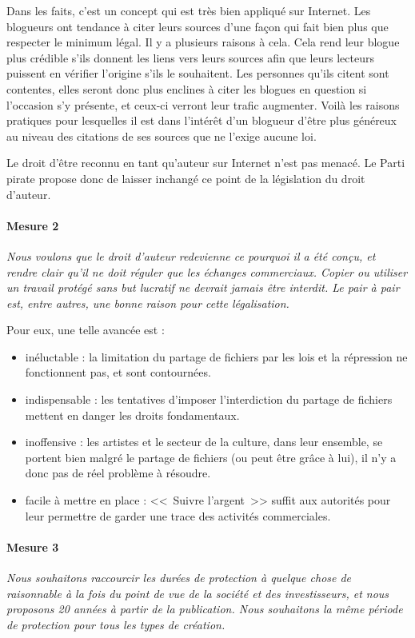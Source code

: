 Dans les faits, c'est un concept qui est très bien appliqué sur Internet.
Les blogueurs ont tendance à citer leurs sources d'une façon qui fait bien plus que respecter le minimum légal.
Il y a plusieurs raisons à cela.
Cela rend leur blogue plus crédible s'ils donnent les liens vers leurs sources afin que leurs lecteurs puissent en vérifier l'origine s'ils le souhaitent.
Les personnes qu'ils citent sont contentes, elles seront donc plus enclines à citer les blogues en question si l'occasion s'y présente, et ceux-ci verront leur trafic augmenter.
Voilà les raisons pratiques pour lesquelles il est dans l'intérêt d'un blogueur d'être plus généreux au niveau des citations de ses sources que ne l'exige aucune loi.

Le droit d'être reconnu en tant qu'auteur sur Internet n'est pas menacé.
Le Parti pirate propose donc de laisser inchangé ce point de la législation du droit d'auteur.

\paragraph{Mesure 2}
\textit{Nous voulons que le droit d'auteur redevienne ce pourquoi il a été conçu, et rendre clair qu'il ne doit réguler que les échanges commerciaux. Copier ou utiliser un travail protégé sans but lucratif ne devrait jamais être interdit.
Le pair à pair est, entre autres, une bonne raison pour cette légalisation.}

Pour eux, une telle avancée est :

\begin{itemize}
\item inéluctable : la limitation du partage de fichiers par les lois et la répression ne fonctionnent pas, et sont contournées.
\item indispensable : les tentatives d'imposer l'interdiction du partage de fichiers mettent en danger les droits fondamentaux.
\item inoffensive : les artistes et le secteur de la culture, dans leur ensemble, se portent bien malgré le partage de fichiers (ou peut être grâce à lui), il n'y a donc pas de réel problème à résoudre.
\item facile à mettre en place : <<~Suivre l'argent~>> suffit aux autorités pour leur permettre de garder une trace des activités commerciales.
\end{itemize}

\paragraph{Mesure 3}
\textit{Nous souhaitons raccourcir les durées de protection à quelque chose de raisonnable à la fois du point de vue de la société et des investisseurs, et nous proposons 20 années à partir de la publication.
Nous souhaitons la même période de protection pour tous les types de création.}

